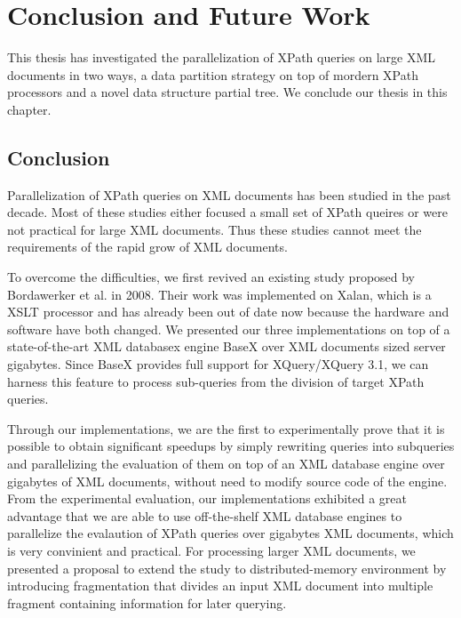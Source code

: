 \chapter{Conclusion and Future Work}

This thesis has investigated the parallelization of XPath queries on large XML
documents in two ways, a data partition strategy on top of mordern XPath
processors and a novel data structure partial tree. We conclude our thesis in
this chapter.

\section{Conclusion}

Parallelization of XPath queries on XML documents has been studied in the past
decade. Most of these studies either focused a small set of XPath queires or
were not practical for large XML documents. Thus these studies cannot meet the
requirements of the rapid grow of XML documents.

To overcome the difficulties, we first revived an existing study proposed by
Bordawerker et al. in 2008. Their work was implemented on Xalan, which is a XSLT
processor and has already been out of date now because the hardware and software
have both changed. We presented our three implementations on top of a
state-of-the-art XML databasex engine BaseX over XML documents sized server
gigabytes. Since BaseX provides full support for XQuery/XQuery 3.1, we can
harness this feature to process sub-queries from the division of target XPath
queries. 

Through our implementations, we are the first to experimentally prove that it is
possible to obtain significant speedups by simply rewriting queries into
subqueries and parallelizing the evaluation of them on top of an XML database
engine over gigabytes of XML documents, without need to modify source code of
the engine. From the experimental evaluation, our implementations exhibited a
great advantage that we are able to use off-the-shelf XML database engines to
parallelize the evalaution of XPath queries over gigabytes XML documents, which
is very convinient and practical. For processing larger XML documents, we
presented a proposal to extend the study to distributed-memory environment by
introducing fragmentation that divides an input XML document  into multiple
fragment containing information for later querying.

